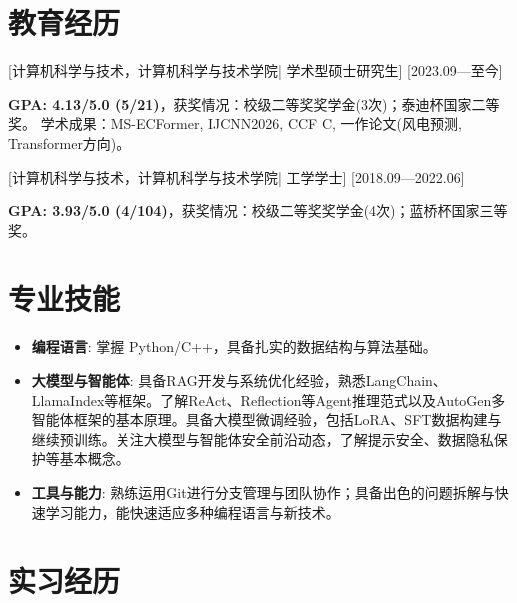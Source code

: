 \documentclass{resume}
\begin{document}


\ResumeTitle


\section{教育经历}
[\textnormal{计算机科学与技术，计算机科学与技术学院|}  学术型硕士研究生]
[2023.09—至今]

\textbf{GPA: 4.13/5.0 (5/21)}，获奖情况：校级二等奖奖学金(3次)；泰迪杯国家二等奖。
学术成果：MS-ECFormer, IJCNN2026, CCF C, 一作论文(风电预测, Transformer方向)。

[\textnormal{计算机科学与技术，计算机科学与技术学院|} 工学学士]
[2018.09—2022.06]

\textbf{GPA: 3.93/5.0 (4/104)}，获奖情况：校级二等奖奖学金(4次)；蓝桥杯国家三等奖。

\section[专业技能]{专业技能}
\begin{itemize}
  \item \textbf{编程语言}: 掌握 Python/C++，具备扎实的数据结构与算法基础。
  \item \textbf{大模型与智能体}: 具备RAG开发与系统优化经验，熟悉LangChain、LlamaIndex等框架。了解ReAct、Reflection等Agent推理范式以及AutoGen多智能体框架的基本原理。具备大模型微调经验，包括LoRA、SFT数据构建与继续预训练。关注大模型与智能体安全前沿动态，了解提示安全、数据隐私保护等基本概念。
  \item \textbf{工具与能力}: 熟练运用Git进行分支管理与团队协作；具备出色的问题拆解与快速学习能力，能快速适应多种编程语言与新技术。
\end{itemize}

\section{实习经历}
\end{document}
